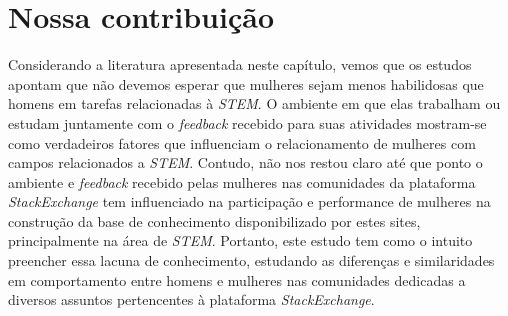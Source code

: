 \section{Nossa contribuição}

Considerando a literatura apresentada neste capítulo, vemos que os estudos apontam que não devemos esperar que mulheres sejam menos habilidosas que homens em tarefas relacionadas à \emph{STEM}. O ambiente em que elas trabalham ou estudam juntamente com o \emph{feedback} recebido para suas atividades mostram-se como verdadeiros fatores que influenciam o relacionamento de mulheres com campos relacionados a \emph{STEM}. Contudo, não nos restou claro até que ponto o ambiente e \emph{feedback} recebido pelas mulheres nas comunidades da plataforma \emph{StackExchange} tem influenciado na participação e performance de mulheres na construção da base de conhecimento disponibilizado por estes sites, principalmente na área de \emph{STEM}. Portanto, este estudo tem como o intuito preencher essa lacuna de conhecimento, estudando as diferenças e similaridades em comportamento entre homens e mulheres nas comunidades dedicadas a diversos assuntos pertencentes à plataforma \emph{StackExchange}.

